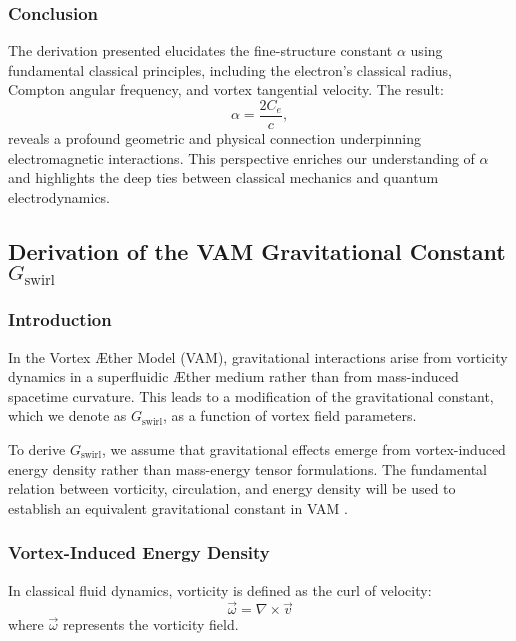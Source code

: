 \subsubsection*{Conclusion}
The derivation presented elucidates the fine-structure constant $\alpha$ using fundamental classical principles, including the electron's classical radius, Compton angular frequency, and vortex tangential velocity. The result:
\begin{equation*}
    \alpha = \frac{2 C_e}{c},
\end{equation*}
reveals a profound geometric and physical connection underpinning electromagnetic interactions.
This perspective enriches our understanding of $\alpha$ and highlights the deep ties between classical mechanics and quantum electrodynamics.


\subsection{Derivation of the VAM Gravitational Constant \(  G_\text{swirl} \)}

\subsubsection*{Introduction}
In the Vortex Æther Model (VAM), gravitational interactions arise from vorticity dynamics in a superfluidic Æther medium rather than from mass-induced spacetime curvature. This leads to a modification of the gravitational constant, which we denote as \(  G_\text{swirl} \), as a function of vortex field parameters.

To derive \(  G_\text{swirl} \), we assume that gravitational effects emerge from vortex-induced energy density rather than mass-energy tensor formulations. The fundamental relation between vorticity, circulation, and energy density will be used to establish an equivalent gravitational constant in VAM \cite{onsager_superfluid,barcelo_superfluid,moffatt_helicity}.

\subsubsection*{Vortex-Induced Energy Density}
In classical fluid dynamics, vorticity is defined as the curl of velocity:
\begin{equation*}
    \vec{\omega} = \nabla \times \vec{v}
\end{equation*}
where \( \vec{\omega} \) represents the vorticity field.

